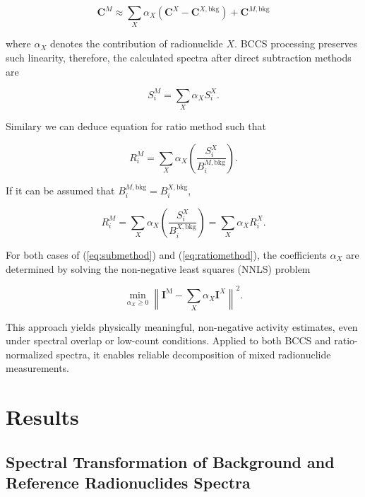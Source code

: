 \documentclass[10pt]{wlscirep}
\begin{document}
\begin{equation}
\textbf{C}^M \approx \sum_{X} \alpha_X (\textbf{C}^{X} - \textbf{C}^{X,\text{bkg}}) + \textbf{C}^{M,\textrm{bkg}}
\end{equation}

\noindent where $\alpha_X$ denotes the contribution of radionuclide $X$. BCCS processing preserves such linearity, therefore, the calculated spectra after direct subtraction methods are

\begin{equation}
S_i^M = \sum_X \alpha_X S_i^X.\label{eq:submethod}
\end{equation}

Similary we can deduce equation for ratio method such that 

\begin{equation*}
R_i^M = \sum_X \alpha_X \left(\dfrac{S_i^X}{B_i^{M,\text{bkg}}}\right).
\end{equation*}

If it can be assumed that $B_i^{M,\text{bkg}}= B_i^{X,\text{bkg}}$, 

\begin{equation}
R_i^M = \sum_X \alpha_X \left(\dfrac{S_i^X}{B_i^{X,\text{bkg}}}\right) = \sum_X \alpha_X R_i^X.\label{eq:ratiomethod}
\end{equation}


For both cases of (\ref{eq:submethod}) and (\ref{eq:ratiomethod}), the coefficients $\alpha_X$ are determined by solving the non-negative least squares (NNLS) problem

\begin{equation}
\min_{\alpha_X \ge 0} \left\| \textbf{I}^{\text{M}} - \sum_{X} \alpha_X \textbf{I}^{X}\right\|^2 .
\end{equation}

This approach yields physically meaningful, non-negative activity estimates, even under spectral overlap or low-count conditions. Applied to both BCCS and ratio-normalized spectra, it enables reliable decomposition of mixed radionuclide measurements.

\section*{Results}


\subsection*{Spectral Transformation of Background and Reference Radionuclides Spectra}
\end{document}
